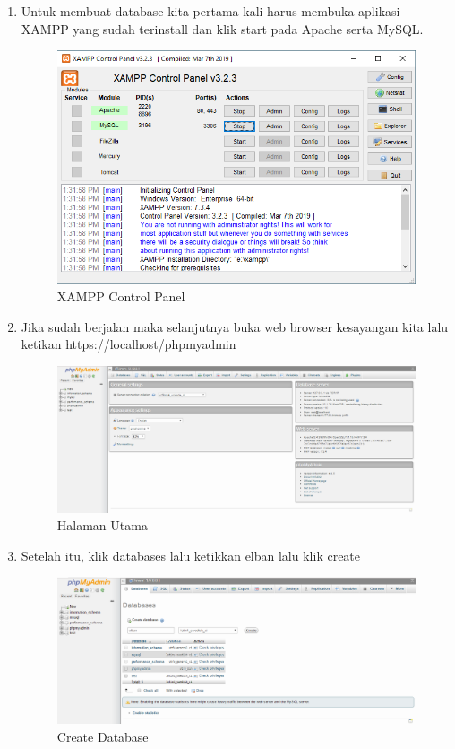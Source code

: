 \begin{enumerate}
\item Untuk membuat database kita pertama kali harus membuka aplikasi XAMPP yang sudah terinstall dan klik start pada Apache serta MySQL.

 \begin{figure}[h]
\centering
\includegraphics[scale=0.5]{figures/controlpanel}
\caption{XAMPP Control Panel}
\end{figure}

\item Jika sudah berjalan maka selanjutnya buka web browser kesayangan kita lalu ketikan https://localhost/phpmyadmin

 \begin{figure}[c]
\centering
\includegraphics[scale=0.35]{figures/phpmyadmin}
\caption{Halaman Utama}
\end{figure}

\item Setelah itu, klik databases lalu ketikkan elban lalu klik create

 \begin{figure}[c]
\centering
\includegraphics[scale=0.35]{figures/databases}
\caption{Create Database}
\end{figure}


\end{enumerate}
